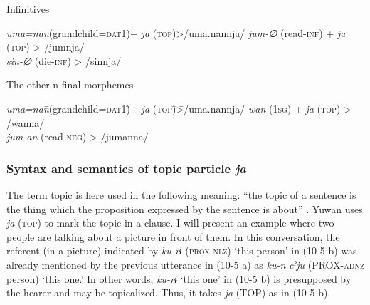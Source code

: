   \ex Infinitives
    \begin{tabbing}
    \textit{uma=nan}\hspace{\tabcolsep}\=\hspace{\tabcolsep}(grandchild=\textsc{dat}1)\hspace{\tabcolsep}\=\hspace{\tabcolsep}+  \textit{ja} (\textsc{top})\hspace{\tabcolsep}\=\hspace{\tabcolsep}>\hspace{\tabcolsep}\=\hspace{\tabcolsep}/uma.nannja/\kill
    \textit{jum-∅} \> (read-\textsc{inf}) \>  +  \textit{ja} (\textsc{top}) \> > \> /jumnja/\\
    \textit{sin-∅} \> (die-\textsc{inf})  \>                       \> > \> /sinnja/\\
    \end{tabbing}

  \ex The other n-final morphemes
    \begin{tabbing}
    \textit{uma=nan}\hspace{\tabcolsep}\=\hspace{\tabcolsep}(grandchild=\textsc{dat}1)\hspace{\tabcolsep}\=\hspace{\tabcolsep}+  \textit{ja} (\textsc{top})\hspace{\tabcolsep}\=\hspace{\tabcolsep}>\hspace{\tabcolsep}\=\hspace{\tabcolsep}/uma.nannja/\kill
    \textit{wan}    \> (1\textsc{sg})      \>    +  \textit{ja} (\textsc{top}) \> > \> /wanna/  \\
    \textit{jum-an} \> (read-\textsc{neg}) \>                         \> > \> /jumanna/\\
    \end{tabbing}
\z
\z

\subsubsection{Syntax and semantics of topic particle \textit{ja}}\label{sec:10.1.1.2}

The term topic is here used in the following meaning: “the topic of a sentence is the thing which the proposition expressed by the sentence is about” \citep[118]{Lambrecht1994}. Yuwan uses \textit{ja} (\textsc{top}) to mark the topic in a clause. I will present an example where two people are talking about a picture in front of them. In this conversation, the referent (in a picture) indicated by \textit{ku-rɨ} (\textsc{prox}-\textsc{nlz}) ‘this person’ in (10-5 b) was already mentioned by the previous utterance in (10-5 a) as \textit{ku-n} \textit{cˀju} (PROX-\textsc{adnz} person) ‘this one.’ In other words, \textit{ku-rɨ} ‘this one’ in (10-5 b) is presupposed by the hearer and may be topicalized. Thus, it takes \textit{ja} (TOP) as in (10-5 b).

